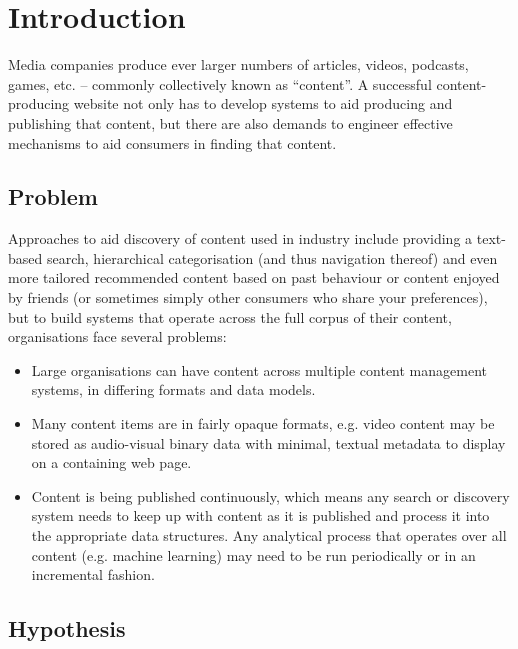 \documentclass{sig-alternate-05-2015}
\begin{document}

\section{Introduction}

Media companies produce ever larger numbers of articles, videos, podcasts,
games, etc. -- commonly collectively known as ``content''. A successful
content-producing website not only has to develop systems to aid producing and
publishing that content, but there are also demands to engineer effective
mechanisms to aid consumers in finding that content.

\subsection{Problem}

Approaches to aid discovery of content used in industry include providing a
text-based search, hierarchical
categorisation (and thus navigation thereof) and even more tailored recommended
content based on past behaviour or content enjoyed by friends (or sometimes
simply other consumers who share your preferences), but to build systems
that operate across the full corpus of their content, organisations face
several problems:

\begin{itemize}

\item Large organisations can have content across multiple content management
systems, in differing formats and data models.

\item Many content items are in fairly opaque formats, e.g. video content may be
stored as audio-visual binary data with minimal, textual metadata to display on
a containing web page.

\item Content is being published continuously, which means any search or
discovery system needs to keep up with content as it is published and process it
into the appropriate data structures. Any analytical process that operates
over all content (e.g. machine learning) may need to be run periodically or in
an incremental fashion.

\end{itemize}

\subsection{Hypothesis}
\end{document}
